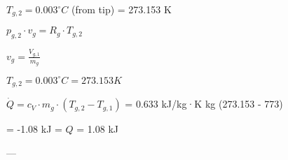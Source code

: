 \( T_{g,2} = 0.003^\circ C \) (from tip)  
= 273.153 K  

\( p_{g,2} \cdot v_{g} = R_{g} \cdot T_{g,2} \)  

\( v_{g} = \frac{V_{g,1}}{m_{g}} \)  

\( T_{g,2} = 0.003^\circ C = 273.153 K \)  

\( \dot{Q} = c_V \cdot m_{g} \cdot (T_{g,2} - T_{g,1}) \)  
= 0.633 kJ/kg·K  kg \cdot (273.153 - 773)  

= -1.08 kJ = \( Q \) = 1.08 kJ  

---